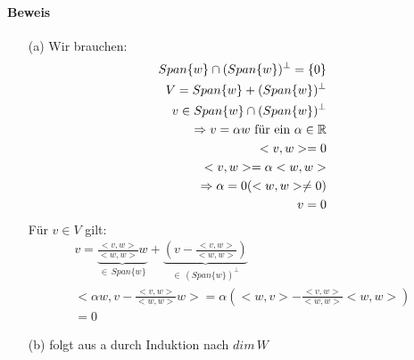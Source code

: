 \paragraph{Beweis}
\begin{itemize}
\item[(a)] Wir brauchen:
\begin{align}
Span\{w\} \cap (Span\{w\})^{\perp} = \{0\} \\
V = Span\{w\} + (Span\{w\})^{\perp} \\
v \in Span\{w\} \cap (Span\{w\})^{\perp} \\
\Rightarrow v = \alpha w \text{ für ein } \alpha \in \mathbb{R} \\
<v, w> = 0\\
<v, w> = \alpha <w, w> \\
\Rightarrow \alpha = 0 (<w, w> \neq 0) \\
v = 0
\end{align}
Für $v \in V$ gilt:
\begin{align}
v = \underbrace{\frac{<v, w>}{<w, w>} w}_{\in\,Span\{w\}} + \underbrace{(v - \frac{<v, w>}{<w, w>})}_{\in\, (Span\{w\})^{\perp}} \\
<\alpha w, v - \frac{<v, w>}{<w, w>} w> = \alpha (<w, v> - \frac{<v, w>}{<w, w>}<w, w>) \\
= 0
\end{align}
\item[(b)] folgt aus a durch Induktion nach $dim\,W$
\end{itemize}

